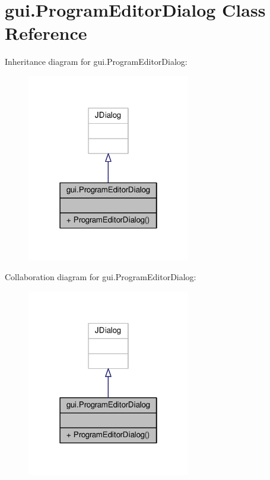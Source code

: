 \hypertarget{classgui_1_1ProgramEditorDialog}{\section{gui.\-Program\-Editor\-Dialog Class Reference}
\label{classgui_1_1ProgramEditorDialog}
}


Inheritance diagram for gui.\-Program\-Editor\-Dialog\-:\nopagebreak
\begin{figure}[H]
\begin{center}
\leavevmode
\includegraphics[width=202pt]{classgui_1_1ProgramEditorDialog__inherit__graph}
\end{center}
\end{figure}


Collaboration diagram for gui.\-Program\-Editor\-Dialog\-:\nopagebreak
\begin{figure}[H]
\begin{center}
\leavevmode
\includegraphics[width=202pt]{classgui_1_1ProgramEditorDialog__coll__graph}
\end{center}
\end{figure}
